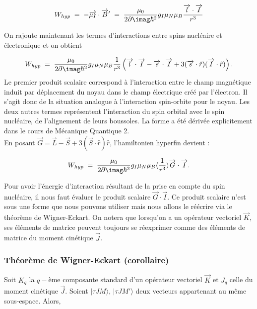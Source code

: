 \[
    W_{hyp} \eq 
    - \overrightarrow{\mu_I} \cdot \overrightarrow{B}'
    \eq
    \dfrac{\mu_0}{2\p\imag\hbar^2} g_I \mu_N \mu_B \dfrac{\overrightarrow{l}\cdot\overrightarrow{I}}{r^3}
\]

 On rajoute maintenant les termes d'interactions entre spins nucléaire et électronique et on obtient

\begin{equation}
    W_{hyp} \eq  \dfrac{\mu_0}{2\p\imag\hbar^2}g_I\mu_N\mu_B\dfrac{1}{r^3}\left( \overrightarrow{l}\cdot\overrightarrow{I}-\overrightarrow{s}\cdot\overrightarrow{I} + 3(\overrightarrow{s}\cdot\hat{r})(\overrightarrow{I}\cdot\hat{r}) \right).
\end{equation}
Le premier produit scalaire correspond à l'interaction entre le champ magnétique induit par déplacement du noyau dans le champ électrique créé par l'électron. Il s'agit donc de la situation analogue à l'interaction spin-orbite pour le noyau. Les deux autres termes représentent l'interaction du spin orbital avec le spin nucléaire, de l'alignement de leurs boussoles. La forme a été dérivée explicitement dans le cours de Mécanique Quantique 2.\\
En posant $\overrightarrow{G} = \overrightarrow{L} - \overrightarrow{S} + 3(\overrightarrow{S}\cdot\hat{r}) \hat{r}$, l'hamiltonien hyperfin devient :

\begin{equation}
     W_{hyp} \eq  \dfrac{\mu_0}{2\p\imag\hbar^2}g_I\mu_N\mu_B\langle\dfrac{1}{r^3}\rangle \overrightarrow{G}\cdot\overrightarrow{I}.
\end{equation}

Pour avoir l’énergie d’interaction résultant de la prise en compte du spin nucléaire, il nous faut évaluer le produit scalaire $\overrightarrow{G} \cdot \overrightarrow{I}$. Ce produit scalaire n’est sous une forme que nous pouvons utiliser mais nous allons le réécrire via le théorème de Wigner-Eckart. On notera que lorsqu’on a un opérateur vectoriel $\overrightarrow{K}$, ses éléments de matrice peuvent toujours se réexprimer comme des éléments de matrice du moment cinétique $\overrightarrow{J}$.



    \subsubsection{Théorème de Wigner-Eckart (corollaire)}



Soit $K_q$ la $q-$ème composante standard d'un opérateur vectoriel $\overrightarrow{K}$ et $J_q$ celle du moment cinétique $\overrightarrow{J}$. Soient $|\tau JM\rangle$, $|\tau JM'\rangle$ deux vecteurs appartenant au même sous-espace. Alors,

